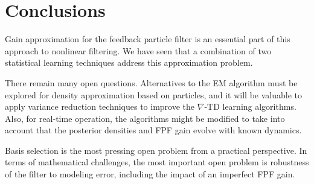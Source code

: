 \section{Conclusions}
\label{section_conclusions}

Gain approximation for the feedback particle filter is an essential part of this approach to nonlinear filtering.  We have seen that a combination of two statistical learning techniques address this approximation problem.

There remain many open questions.   Alternatives to the EM algorithm must be explored for density approximation based on particles,  and it will be valuable to apply variance reduction techniques to improve the $\nabla$-TD learning algorithms.  Also, for real-time operation, the algorithms might be modified to take into account that the posterior densities and FPF gain evolve with known dynamics.  

Basis selection is the most pressing open problem from a practical perspective.  In terms of mathematical challenges, the most important open problem is robustness of the filter to modeling error, including the impact of an imperfect FPF gain.

